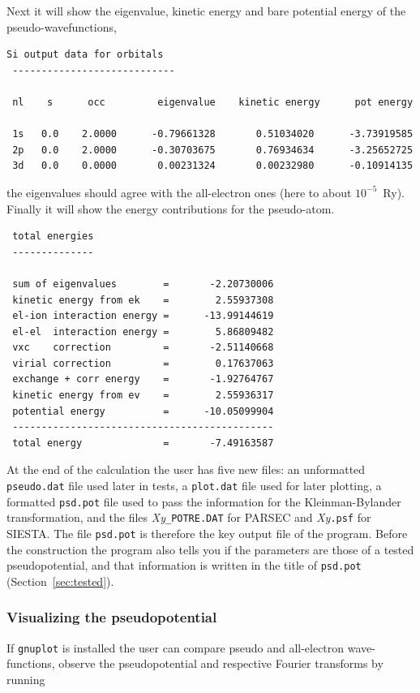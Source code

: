 \documentclass[11pt]{article}
\begin{document}
Next it will show the eigenvalue, kinetic energy and bare potential energy of the pseudo-wavefunctions,
\begin{verbatim}
Si output data for orbitals
 ----------------------------

 nl    s      occ         eigenvalue    kinetic energy      pot energy

 1s   0.0    2.0000      -0.79661328       0.51034020      -3.73919585
 2p   0.0    2.0000      -0.30703675       0.76934634      -3.25652725
 3d   0.0    0.0000       0.00231324       0.00232980      -0.10914135
\end{verbatim}
the eigenvalues should agree with the all-electron ones (here to about $10^{-5}$~Ry).
Finally it will show the energy contributions for the pseudo-atom.
\begin{verbatim}
 total energies
 --------------

 sum of eigenvalues        =       -2.20730006
 kinetic energy from ek    =        2.55937308
 el-ion interaction energy =      -13.99144619
 el-el  interaction energy =        5.86809482
 vxc    correction         =       -2.51140668
 virial correction         =        0.17637063
 exchange + corr energy    =       -1.92764767
 kinetic energy from ev    =        2.55936317
 potential energy          =      -10.05099904
 ---------------------------------------------
 total energy              =       -7.49163587
\end{verbatim}




At the end of the calculation the user has five new files: an unformatted
\texttt{pseudo.dat} file used later in tests,
a \texttt{plot.dat} file used for later plotting,
a formatted \texttt{psd.pot} file used to pass the information for the Kleinman-Bylander transformation,
and the files \textit{Xy}\texttt{\_POTRE.DAT} for PARSEC and \textit{Xy}\texttt{.psf} for \textsc{SIESTA}.
The file \texttt{psd.pot} is therefore the key output file of the program.
Before the construction the program also tells you if the parameters are those of
a tested pseudopotential, and that information is written in the title of \texttt{psd.pot}
(Section~\ref{sec:tested}).


\subsubsection{Visualizing the pseudopotential}
\label{sec:run-show}

If \texttt{gnuplot} is installed the user can compare pseudo and all-electron wave-functions,
observe the pseudopotential and respective Fourier transforms by running
\end{document}
